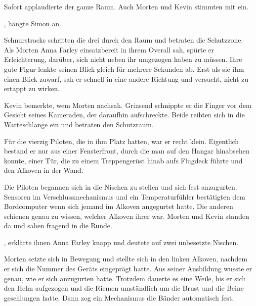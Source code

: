\par

Sofort applaudierte der ganze Raum. Auch Morten und Kevin stimmten mit ein.

\par

, hängte Simon an. 

\par

Schnurstracks schritten die drei durch den Raum und betraten die Schutzzone. Als Morten Anna Farley einsatzbereit in ihrem Overall sah, spürte er Erleichterung, darüber, sich nicht neben ihr umgezogen haben zu müssen. Ihre gute Figur lenkte seinen Blick gleich für mehrere Sekunden ab. Erst als sie ihm einen Blick zuwarf, sah er schnell in eine andere Richtung und versucht, nicht zu ertappt zu wirken.

\par

Kevin bemerkte, wem Morten nachsah. Grinsend schnippte er die Finger vor dem Gesicht seines Kameraden, der daraufhin aufschreckte. Beide reihten sich in die Warteschlange ein und betraten den Schutzraum.

\par

Für die vierzig Piloten, die in ihm Platz hatten, war er recht klein. Eigentlich bestand er nur aus einer Fensterfront, durch die man auf den Hangar hinabsehen konnte, einer Tür, die zu einem Treppengerüst hinab aufs Flugdeck führte und den Alkoven in der Wand.

\par

Die Piloten begannen sich in die Nischen zu stellen und sich fest anzugurten. Sensoren im Verschlussmechanismus und ein Temperaturfühler bestätigten dem Bordcomputer wenn sich jemand im Alkoven angegurtet hatte. Die anderen schienen genau zu wissen, welcher Alkoven ihrer war. Morten und Kevin standen da und sahen fragend in die Runde.

\par

, erklärte ihnen Anna Farley knapp und deutete auf zwei unbesetzte Nischen.

\par

Morten setzte sich in Bewegung und stellte sich in den linken Alkoven, nachdem er sich die Nummer des Geräts eingeprägt hatte. Aus seiner Ausbildung wusste er genau, wie er sich anzugurten hatte. Trotzdem dauerte es eine Weile, bis er sich den Helm aufgezogen und die Riemen umständlich um die Brust und die Beine geschlungen hatte. Dann zog ein Mechanismus die Bänder automatisch fest.

